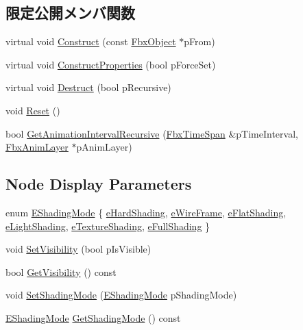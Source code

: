 \subsection*{限定公開メンバ関数}
\begin{DoxyCompactItemize}
\item 
virtual void \hyperlink{class_fbx_node_af500d4f4573e566c878232d89d1b6a9e}{Construct} (const \hyperlink{class_fbx_object}{Fbx\+Object} $\ast$p\+From)
\item 
virtual void \hyperlink{class_fbx_node_ae4391b51da92a665fb905ec9e6295b7d}{Construct\+Properties} (bool p\+Force\+Set)
\item 
virtual void \hyperlink{class_fbx_node_a627ea87f8c93177343351bed8997d278}{Destruct} (bool p\+Recursive)
\item 
void \hyperlink{class_fbx_node_a13f7363abfcbf8d62952464ea3723898}{Reset} ()
\item 
bool \hyperlink{class_fbx_node_a1e5f24d981b2835cbfeba1f8b05d356c}{Get\+Animation\+Interval\+Recursive} (\hyperlink{class_fbx_time_span}{Fbx\+Time\+Span} \&p\+Time\+Interval, \hyperlink{class_fbx_anim_layer}{Fbx\+Anim\+Layer} $\ast$p\+Anim\+Layer)
\end{DoxyCompactItemize}
\subsection*{Node Display Parameters}
\begin{DoxyCompactItemize}
\item 
enum \hyperlink{class_fbx_node_ab65aa5e41d10dfb4c887667c9a56019d}{E\+Shading\+Mode} \{ \newline
\hyperlink{class_fbx_node_ab65aa5e41d10dfb4c887667c9a56019daac9dd7bf7e5bf7d3d17b87ecfc8738cc}{e\+Hard\+Shading}, 
\hyperlink{class_fbx_node_ab65aa5e41d10dfb4c887667c9a56019da5068764db89d286852fdb99ddc0fd721}{e\+Wire\+Frame}, 
\hyperlink{class_fbx_node_ab65aa5e41d10dfb4c887667c9a56019da5d721d42eda063b9400ec4243911bf9c}{e\+Flat\+Shading}, 
\hyperlink{class_fbx_node_ab65aa5e41d10dfb4c887667c9a56019daa2726188f9d8f53a90d230a70013297a}{e\+Light\+Shading}, 
\newline
\hyperlink{class_fbx_node_ab65aa5e41d10dfb4c887667c9a56019daaa3982d2d9173a29140e5dbf0ee64a33}{e\+Texture\+Shading}, 
\hyperlink{class_fbx_node_ab65aa5e41d10dfb4c887667c9a56019daefdf7b2d72751923449653d4a31780b6}{e\+Full\+Shading}
 \}
\item 
void \hyperlink{class_fbx_node_a9550907cb5b273af36951e207a4666e7}{Set\+Visibility} (bool p\+Is\+Visible)
\item 
bool \hyperlink{class_fbx_node_a5c3884c6558fcf5c3078d00dc6887e2c}{Get\+Visibility} () const
\item 
void \hyperlink{class_fbx_node_a61b51ec80b6214984bfb4739fc00ea93}{Set\+Shading\+Mode} (\hyperlink{class_fbx_node_ab65aa5e41d10dfb4c887667c9a56019d}{E\+Shading\+Mode} p\+Shading\+Mode)
\item 
\hyperlink{class_fbx_node_ab65aa5e41d10dfb4c887667c9a56019d}{E\+Shading\+Mode} \hyperlink{class_fbx_node_a5f4b25e0dd49cdf22bf4dcb57843c058}{Get\+Shading\+Mode} () const
\end{DoxyCompactItemize}
